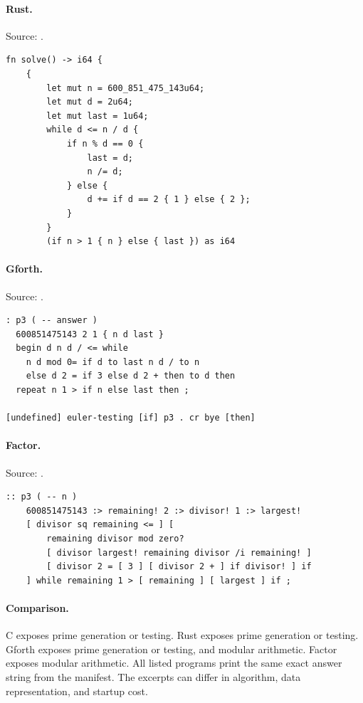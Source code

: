 \paragraph{Rust.} Source: .
\begin{lstlisting}
fn solve() -> i64 {
    {
        let mut n = 600_851_475_143u64;
        let mut d = 2u64;
        let mut last = 1u64;
        while d <= n / d {
            if n % d == 0 {
                last = d;
                n /= d;
            } else {
                d += if d == 2 { 1 } else { 2 };
            }
        }
        (if n > 1 { n } else { last }) as i64
\end{lstlisting}

\paragraph{Gforth.} Source: .
\begin{lstlisting}
: p3 ( -- answer )
  600851475143 2 1 { n d last }
  begin d n d / <= while
    n d mod 0= if d to last n d / to n
    else d 2 = if 3 else d 2 + then to d then
  repeat n 1 > if n else last then ;

[undefined] euler-testing [if] p3 . cr bye [then]
\end{lstlisting}

\paragraph{Factor.} Source: .
\begin{lstlisting}
:: p3 ( -- n )
    600851475143 :> remaining! 2 :> divisor! 1 :> largest!
    [ divisor sq remaining <= ] [
        remaining divisor mod zero?
        [ divisor largest! remaining divisor /i remaining! ]
        [ divisor 2 = [ 3 ] [ divisor 2 + ] if divisor! ] if
    ] while remaining 1 > [ remaining ] [ largest ] if ;
\end{lstlisting}

\paragraph{Comparison.}
C exposes prime generation or testing. Rust exposes prime generation or testing. Gforth exposes prime generation or testing, and modular arithmetic. Factor exposes modular arithmetic.
All listed programs print the same exact answer string from the manifest. The excerpts can differ in algorithm, data representation, and startup cost.

